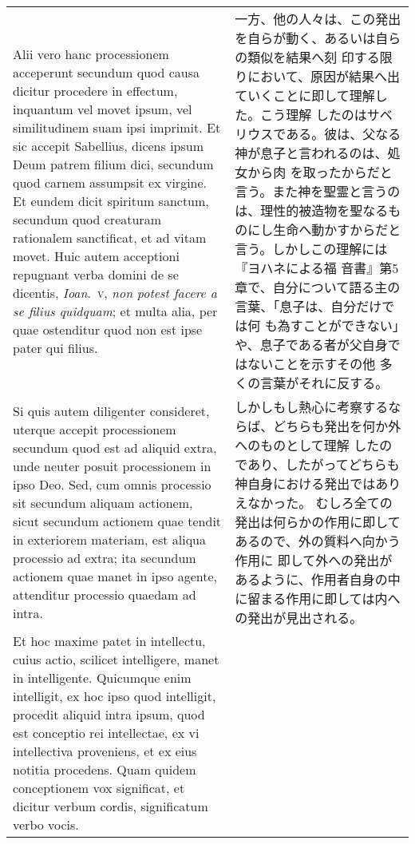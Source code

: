 \documentclass[10pt]{jsarticle} %
\begin{document}
\begin{longtable}{p{21em}p{21em}}
\\


Alii vero hanc processionem acceperunt secundum
quod causa dicitur procedere in effectum, inquantum vel movet ipsum, vel
similitudinem suam ipsi imprimit. Et sic accepit Sabellius, dicens ipsum
Deum patrem filium dici, secundum quod carnem assumpsit ex virgine. Et
eundem dicit spiritum sanctum, secundum quod creaturam rationalem
sanctificat, et ad vitam movet. Huic autem acceptioni repugnant verba
domini de se dicentis, {\itshape Ioan}.~{\scshape v}, {\itshape non potest facere a se filius quidquam};
et multa alia, per quae ostenditur quod non est ipse pater qui
filius. 



&

一方、他の人々は、この発出を自らが動く、あるいは自らの類似を結果へ刻
 印する限りにおいて、原因が結果へ出ていくことに即して理解した。こう理解
 したのはサベリウスである。彼は、父なる神が息子と言われるのは、処女から肉
 を取ったからだと言う。また神を聖霊と言うのは、理性的被造物を聖なるも
 のにし生命へ動かすからだと言う。しかしこの理解には『ヨハネによる福
 音書』第5章で、自分について語る主の言葉、「息子は、自分だけでは何
 も為すことができない」や、息子である者が父自身ではないことを示すその他
 多くの言葉がそれに反する。


\\


Si quis autem diligenter consideret, uterque accepit
processionem secundum quod est ad aliquid extra, unde neuter posuit
processionem in ipso Deo. Sed, cum omnis processio sit secundum aliquam
actionem, sicut secundum actionem quae tendit in exteriorem materiam,
est aliqua processio ad extra; ita secundum actionem quae manet in ipso
agente, attenditur processio quaedam ad intra. 

&


しかしもし熱心に考察するならば、どちらも発出を何か外へのものとして理解
 したのであり、したがってどちらも神自身における発出ではありえなかった。
むしろ全ての発出は何らかの作用に即してあるので、外の質料へ向かう作用に
 即して外への発出があるように、作用者自身の中に留まる作用に即しては内へ
 の発出が見出される。


\\

Et hoc maxime patet in
intellectu, cuius actio, scilicet intelligere, manet in
intelligente. Quicumque enim intelligit, ex hoc ipso quod intelligit,
procedit aliquid intra ipsum, quod est conceptio rei intellectae, ex vi
intellectiva proveniens, et ex eius notitia procedens. Quam quidem
conceptionem vox significat, et dicitur verbum cordis, significatum
verbo vocis. 



\end{longtable}
\end{document}
